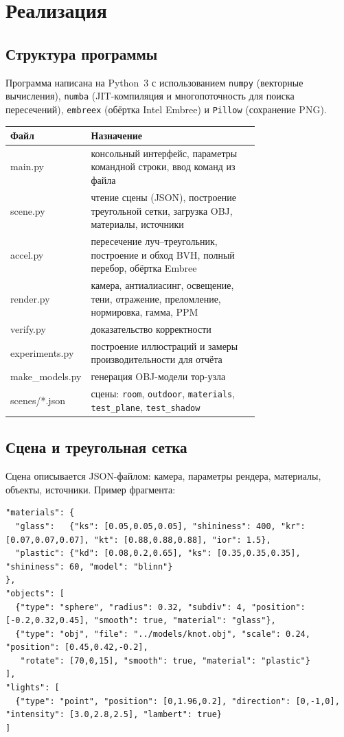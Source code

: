 \documentclass[12pt,a4paper]{article}
\begin{document}
\section{Реализация}

\subsection{Структура программы}

Программа написана на Python~3 с использованием \texttt{numpy} (векторные вычисления), \texttt{numba}
(JIT-компиляция и многопоточность для поиска пересечений), \texttt{embreex} (обёртка Intel Embree) и \texttt{Pillow}
(сохранение PNG).

\begin{center}
\small
\begin{tabular}{>{\ttfamily}l>{\raggedright\arraybackslash}p{0.72\linewidth}}
\toprule
\normalfont Файл & Назначение \\
\midrule
main.py & консольный интерфейс, параметры командной строки, ввод команд из файла \\
scene.py & чтение сцены (JSON), построение треугольной сетки, загрузка OBJ, материалы, источники \\
accel.py & пересечение луч–треугольник, построение и обход BVH, полный перебор, обёртка Embree \\
render.py & камера, антиалиасинг, освещение, тени, отражение, преломление, нормировка, гамма, PPM \\
verify.py & доказательство корректности \\
experiments.py & построение иллюстраций и замеры производительности для отчёта \\
make\_models.py & генерация OBJ-модели тор-узла \\
scenes/*.json & сцены: \texttt{room}, \texttt{outdoor}, \texttt{materials}, \texttt{test\_plane}, \texttt{test\_shadow} \\
\bottomrule
\end{tabular}
\end{center}

\subsection{Сцена и треугольная сетка}

Сцена описывается JSON-файлом: камера, параметры рендера, материалы, объекты, источники. Пример фрагмента:

\begin{lstlisting}[language={}]
"materials": {
  "glass":   {"ks": [0.05,0.05,0.05], "shininess": 400, "kr": [0.07,0.07,0.07], "kt": [0.88,0.88,0.88], "ior": 1.5},
  "plastic": {"kd": [0.08,0.2,0.65], "ks": [0.35,0.35,0.35], "shininess": 60, "model": "blinn"}
},
"objects": [
  {"type": "sphere", "radius": 0.32, "subdiv": 4, "position": [-0.2,0.32,0.45], "smooth": true, "material": "glass"},
  {"type": "obj", "file": "../models/knot.obj", "scale": 0.24, "position": [0.45,0.42,-0.2],
   "rotate": [70,0,15], "smooth": true, "material": "plastic"}
],
"lights": [
  {"type": "point", "position": [0,1.96,0.2], "direction": [0,-1,0], "intensity": [3.0,2.8,2.5], "lambert": true}
]
\end{lstlisting}
\end{document}
